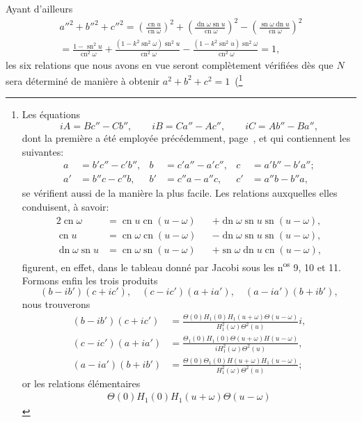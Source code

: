 \documentclass[11pt,leqno,oneside,letterpaper]{book}[2005/09/16]
\DeclareMathOperator{\sn}{sn}
\DeclareMathOperator{\cn}{cn}
\DeclareMathOperator{\dn}{dn}
\begin{document}
Ayant d'ailleurs
\begin{multline*}
  a''^2 + b''^2 + c''^2
= \left( \frac{          \cn u}{\cn\omega} \right)^2
 + \left( \frac{\dn\omega \sn u}{\cn\omega} \right)^2
 - \left( \frac{\sn\omega \dn u}{\cn\omega} \right)^2
\\
= \frac{ 1-                \sn^2 u}{\cn^2\omega}
 + \frac{(1-k^2\sn^2\omega) \sn^2 u}{\cn^2\omega}
 - \frac{(1-k^2\sn^2 u) \sn^2\omega}{\cn^2\omega} = 1,
\end{multline*}
les six relations que nous avons en vue seront compl\`etement v\'erifi\'ees d\`es
que $N$ sera d\'etermin\'e de mani\`ere \`a obtenir
$a^2 + b^2 + c^2 = 1$~(\footnote{%
  Les \'equations
\[
  iA = Bc'' - Cb'', \qquad iB = Ca'' - Ac'', \qquad iC = Ab'' - Ba'',
\]
dont la premi\`ere a \'et\'e employ\'ee pr\'ec\'edemment,
page~\pageref{page27b}, et qui contiennent les suivantes:
\begin{align*}
  a &= b'c'' - c'b'', &
  b &= c'a'' - a'c'', &
  c &= a'b'' - b'a'';
\\
  a'&= b''c - c''b, &
  b'&= c''a - a''c, &
  c'&= a''b - b''a,
\end{align*}
se v\'erifient aussi de la mani\`ere la plus facile. Les relations auxquelles elles conduisent, \`a
savoir:
\begin{alignat*}{2}
   \cn\omega
&= \cn u      \cn(u-\omega) &&+ \dn\omega\sn u \sn (u-\omega),
\\
   \cn u
&= \cn \omega \cn(u-\omega) &&- \dn\omega\sn u \sn (u-\omega),
\\
   \dn\omega\sn u
&= \cn \omega \sn(u-\omega) &&+ \sn\omega\dn u \cn (u-\omega),
\end{alignat*}
figurent, en effet, dans le tableau donn\'e par Jacobi sous les
n\textsuperscript{os} 9, 10 et 11. Formons enfin les trois produits
\[
(b-ib')(c + ic'),\quad (c-ic')(a + ia'),\quad (a-ia')(b+ib'),
\]
nous trouverons
\begin{align*}
   (b-ib')(c+ic')
&= \frac{ \Theta(0)H_1(0)H_1(u+\omega)\Theta(u-\omega) }
        {  H_1^2(\omega)\Theta^2(u) } i,
\\
   (c-ic')(a+ia')
&= \frac{ \Theta_1(0)H_1(0)\Theta(u+\omega)H(u-\omega) }
        { iH_1^2(\omega)\Theta^2(u) },
\\
   (a-ia')(b+ib')
&= \frac{ \Theta(0)\Theta_1(0)H(u+\omega)H_1(u-\omega) }
        {  H_1^2(\omega)\Theta^2(u) };
\end{align*}
or les relations \'el\'ementaires
\begin{align*}
   \Theta(0)H_1(0)H_1(u+\omega)\Theta(u-\omega)

\end{align*}}
\end{document}
